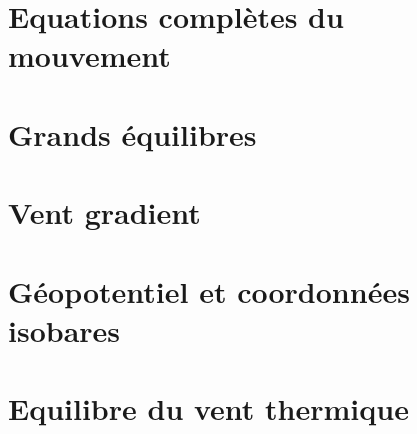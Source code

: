 \documentclass[a4paper,DIV16,10pt]{scrartcl}
\begin{document}
\section{Equations complètes du mouvement}


%

%


%	

%	


\section{Grands équilibres}


\newpage
\section{Vent gradient}


\newpage
\section{Géopotentiel et coordonnées isobares}


\newpage
\section{Equilibre du vent thermique}


%

%
\end{document}
